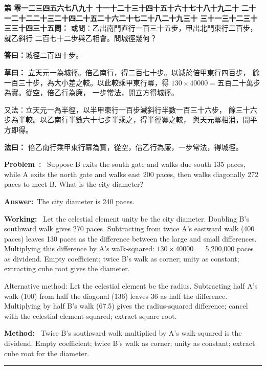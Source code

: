 \documentclass[9pt,a4paper]{article}
\newcounter{probnum}
\newcounter{overallnum}
\newcommand{\chnum}[1]{%
  \ifcase#1 零\or 一\or 二\or 三\or 四\or 五\or 六\or 七\or 八\or 九\or 十\or
    十一\or 十二\or 十三\or 十四\or 十五\or 十六\or 十七\or 十八\or 十九\or 二十\or
    二十一\or 二十二\or 二十三\or 二十四\or 二十五\or 二十六\or 二十七\or 二十八\or 二十九\or 三十\or
    三十一\or 三十二\or 三十三\or 三十四\or 三十五\fi}
\newcommand{\problem}[1]{\stepcounter{probnum}\stepcounter{overallnum}\par\noindent\textbf{\color{volcolor}第\chnum{\value{probnum}}問：}#1\par\vspace{0.15cm}}
\newcommand{\answer}[1]{\par\noindent\textbf{答曰：}#1\par\vspace{0.15cm}}
\newcommand{\working}[1]{\par\noindent\textbf{草曰：}#1\par\vspace{0.15cm}}
\newcommand{\method}[1]{\par\noindent\textbf{法曰：}#1\par\vspace{0.25cm}}
\newcommand{\eproblem}[1]{\par\noindent\textbf{\color{volcolor}Problem~\theoverallnum:}~#1\par\vspace{0.15cm}}
\newcommand{\eanswer}[1]{\par\noindent\textbf{Answer:}~#1\par\vspace{0.15cm}}
\newcommand{\eworking}[1]{\par\noindent\textbf{Working:}~#1\par\vspace{0.15cm}}
\newcommand{\emethod}[1]{\par\noindent\textbf{Method:}~#1\par\vspace{0.25cm}}
\begin{document}
\noindent\begin{minipage}[t]{0.48\textwidth}
\problem{
或問：乙出南門直行一百三十五步，甲出北門東行二百步，就乙斜行
二百七十二步與乙相會。問城徑幾何？
}

\answer{城徑二百四十步。}

\working{
立天元一為城徑。倍乙南行，得二百七十步。以減於倍甲東行四百步，
餘一百三十步，為大小差之較。以此較乘甲東行冪，得
$130 \times 40000 ={}$五百二十萬步為實。從空，倍乙行為廉，
一步常法，開立方得城徑。

又法：立天元一為半徑，以半甲東行一百步減斜行半數一百三十六步，
餘三十六步為半較。以乙南行半數六十七步半乘之，得半徑冪之較，
與天元冪相消，開平方即得。
}

\method{
倍乙南行乘甲東行冪為實，從空，倍乙行為廉，一步常法，得城徑。
}
\end{minipage}%
\hfill%
\begin{minipage}[t]{0.50\textwidth}
\eproblem{
Suppose B exits the south gate and walks due south 135 paces, while A exits
the north gate and walks east 200 paces, then walks diagonally 272 paces to
meet B. What is the city diameter?
}

\eanswer{The city diameter is 240 paces.}

\eworking{
Let the celestial element unity be the city diameter. Doubling B's southward
walk gives 270 paces. Subtracting from twice A's eastward walk (400 paces)
leaves 130 paces as the difference between the large and small differences.
Multiplying this difference by A's walk-squared: $130 \times 40000 =$
5,200,000 paces as dividend. Empty coefficient; twice B's walk as corner;
unity as constant; extracting cube root gives the diameter.

Alternative method: Let the celestial element be the radius. Subtracting half
A's walk (100) from half the diagonal (136) leaves 36 as half the difference.
Multiplying by half B's walk (67.5) gives the radius-squared difference;
cancel with the celestial element-squared; extract square root.
}

\emethod{
Twice B's southward walk multiplied by A's walk-squared is the dividend.
Empty coefficient; twice B's walk as corner; unity as constant;
extract cube root for the diameter.
}
\end{minipage}
\vspace{0.15cm}

\vspace{0.15cm}
\noindent\rule{\textwidth}{0.2pt}
\vspace{0.15cm}
\end{document}
